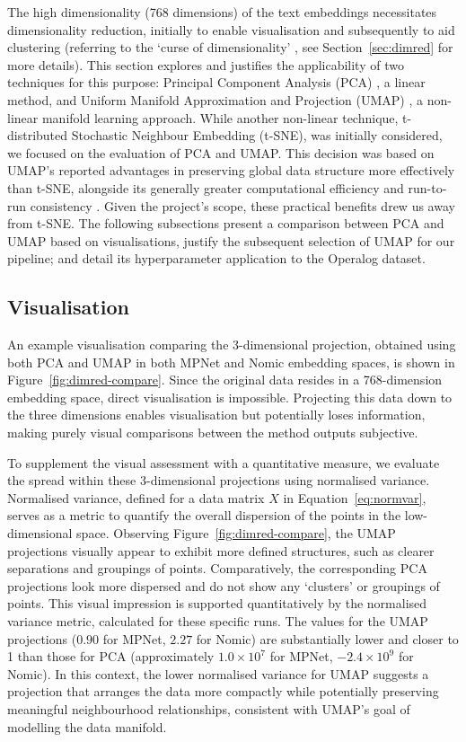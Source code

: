 \documentclass[10pt,oneside]{report}
\begin{document}
The high dimensionality (768 dimensions) of the text embeddings necessitates dimensionality reduction, initially to enable visualisation and subsequently to aid clustering (referring to the `curse of dimensionality' \cite{verleysen2005curse}, see Section~\ref{sec:dimred} for more details). This section explores and justifies the applicability of two techniques for this purpose: Principal Component Analysis (PCA) \cite{pearson1901liii, hotelling1933analysis}, a linear method, and Uniform Manifold Approximation and Projection (UMAP) \cite{mcinnes2018umap}, a non-linear manifold learning approach. While another non-linear technique, t-distributed Stochastic Neighbour Embedding (t-SNE), was initially considered, we focused on the evaluation of PCA and UMAP. This decision was based on UMAP's reported advantages in preserving global data structure more effectively than t-SNE, alongside its generally greater computational efficiency and run-to-run consistency \cite{mcinnes2018umap}. Given the project's scope, these practical benefits drew us away from t-SNE. The following subsections present a comparison between PCA and UMAP based on visualisations, justify the subsequent selection of UMAP for our pipeline; and detail its hyperparameter application to the Operalog dataset.

\subsection{Visualisation}

An example visualisation comparing the 3-dimensional projection, obtained using both PCA and UMAP in both MPNet and Nomic embedding spaces, is shown in Figure~\ref{fig:dimred-compare}. Since the original data resides in a 768-dimension embedding space, direct visualisation is impossible. Projecting this data down to the three dimensions enables visualisation but potentially loses information, making purely visual comparisons between the method outputs subjective.

To supplement the visual assessment with a quantitative measure, we evaluate the spread within these 3-dimensional projections using normalised variance. Normalised variance, defined for a data matrix $X$ in Equation~\ref{eq:normvar}, serves as a metric to quantify the overall dispersion of the points in the low-dimensional space.
Observing Figure~\ref{fig:dimred-compare}, the UMAP projections visually appear to exhibit more defined structures, such as clearer separations and groupings of points. Comparatively, the corresponding PCA projections look more dispersed and do not show any `clusters' or groupings of points. This visual impression is supported quantitatively by the normalised variance metric, calculated for these specific runs. The values for the UMAP projections ($0.90$ for MPNet, $2.27$ for Nomic) are substantially lower and closer to 1 than those for PCA (approximately $1.0 \times 10^7$ for MPNet, $-2.4 \times 10^9$ for Nomic). In this context, the lower normalised variance for UMAP suggests a projection that arranges the data more compactly while potentially preserving meaningful neighbourhood relationships, consistent with UMAP's goal of modelling the data manifold.
\end{document}
